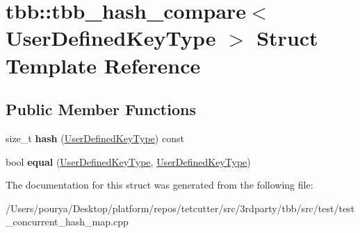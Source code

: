\hypertarget{structtbb_1_1tbb__hash__compare_3_01UserDefinedKeyType_01_4}{}\section{tbb\+:\+:tbb\+\_\+hash\+\_\+compare$<$ User\+Defined\+Key\+Type $>$ Struct Template Reference}
\label{structtbb_1_1tbb__hash__compare_3_01UserDefinedKeyType_01_4}
\subsection*{Public Member Functions}
\begin{DoxyCompactItemize}
\item 
\hypertarget{structtbb_1_1tbb__hash__compare_3_01UserDefinedKeyType_01_4_a35d5ab4758a0efebd20f1d3d446654f3}{}size\+\_\+t {\bfseries hash} (\hyperlink{structUserDefinedKeyType}{User\+Defined\+Key\+Type}) const \label{structtbb_1_1tbb__hash__compare_3_01UserDefinedKeyType_01_4_a35d5ab4758a0efebd20f1d3d446654f3}

\item 
\hypertarget{structtbb_1_1tbb__hash__compare_3_01UserDefinedKeyType_01_4_afd0191af1f85ab9a38773b8d13e78344}{}bool {\bfseries equal} (\hyperlink{structUserDefinedKeyType}{User\+Defined\+Key\+Type}, \hyperlink{structUserDefinedKeyType}{User\+Defined\+Key\+Type})\label{structtbb_1_1tbb__hash__compare_3_01UserDefinedKeyType_01_4_afd0191af1f85ab9a38773b8d13e78344}

\end{DoxyCompactItemize}


The documentation for this struct was generated from the following file\+:\begin{DoxyCompactItemize}
\item 
/\+Users/pourya/\+Desktop/platform/repos/tetcutter/src/3rdparty/tbb/src/test/test\+\_\+concurrent\+\_\+hash\+\_\+map.\+cpp\end{DoxyCompactItemize}
